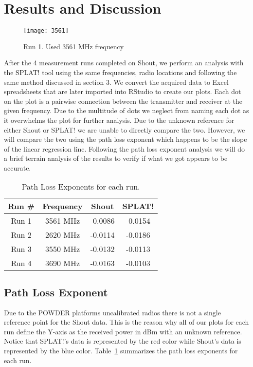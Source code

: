 

\section{Results and Discussion}
\label{sec:evaluation}

\begin{figure}
  \centering
  \texttt{[image: 3561]} 
  \caption{Run 1. Used 3561 MHz frequency}
  \label{fig:3561}
\end{figure}

After the 4 measurement runs completed on Shout, we perform an analysis with the SPLAT! tool using the same frequencies, radio
locations and following the same method discussed in section 3. We convert the acquired data to Excel spreadsheets that are later
imported into RStudio to create our plots. Each dot on the plot is a pairwise connection between the transmitter and receiver at the 
given frequency. Due to the multitude of dots we neglect from naming each dot as it overwhelms the plot for further analysis. Due to the unknown
reference for either Shout or SPLAT! we are unable to directly compare the two. However, we will compare the two using the path loss 
exponent which happens to be the slope of the linear regression line. Following the path loss exponent analysis we will do a brief terrain 
analysis of the results to verify if what we got appears to be accurate. 

\begin{table}[h!]
\centering
\begin{tabular}{||c c c c||} 
 \hline
 \textbf{Run \#} & \textbf{Frequency} & \textbf{Shout} & \textbf{SPLAT!} \\ [0.5ex] 
 \hline\hline
Run 1 & 3561 MHz & -0.0086 & -0.0154 \\ 
Run 2 & 2620 MHz & -0.0114 & -0.0186 \\ 
Run 3 & 3550 MHz & -0.0132 & -0.0113 \\ 
Run 4 & 3690 MHz & -0.0163 & -0.0103 \\ [1ex] 
 \hline
\end{tabular}
\caption{Path Loss Exponents for each run.}
\label{table:1}
\end{table}

\subsection*{Path Loss Exponent}
Due to the POWDER platforms uncalibrated radios there is not a single reference point for the Shout data. This is the reason why all of our plots for each
run define the Y-axis as the received power in dBm with an unknown reference. Notice that SPLAT!'s data is represented by the red color
while Shout's data is represented by the blue color. Table~\ref{table:1} summarizes the path loss exponents for each run.

